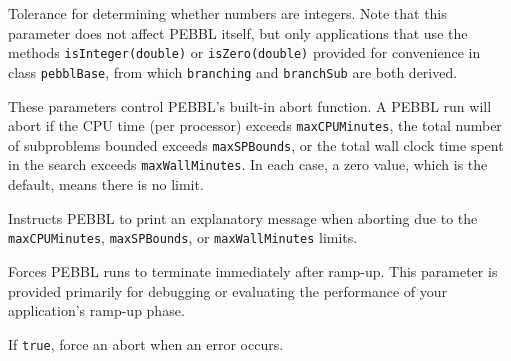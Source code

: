 Tolerance for determining whether numbers are integers.  Note that
this parameter does not affect PEBBL itself, but only applications that
use the methods \texttt{isInteger(double)} or
\texttt{isZero(double)} provided for convenience in class
\texttt{pebblBase}, from which \texttt{branching} and
\texttt{branchSub} are both derived.

\groupparams
{}
\groupparams
{}
These parameters control PEBBL's built-in abort function.  A PEBBL run
will abort if the CPU time (per processor) exceeds
\texttt{maxCPUMinutes}, the total number of subproblems bounded
exceeds \texttt{maxSPBounds}, or the total wall clock time spent in
the search exceeds \texttt{maxWallMinutes}.  In each case, a zero
value, which is the default, means there is no limit.

Instructs PEBBL to print an explanatory message when
aborting due to the \texttt{maxCPUMinutes}, \texttt{maxSPBounds}, or
\texttt{maxWallMinutes} limits.

Forces PEBBL runs to terminate immediately after ramp-up.  This
parameter is provided primarily for debugging or evaluating the
performance of your application's ramp-up phase.

If \texttt{true}, force an abort when an error occurs.


